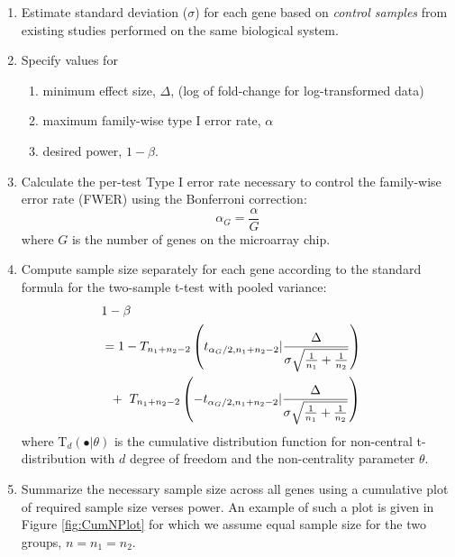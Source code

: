 \documentclass[12pt]{article}
\begin{document}
\begin{enumerate}
\item{Estimate standard deviation ($\sigma$) for each gene based on
    \emph{control samples} from existing studies performed on the
    same biological system.}

\item{Specify values for
    \begin{enumerate}
    \item minimum effect size, $\Delta$, (log of fold-change for
          log-transformed data)
    \item maximum family-wise type I error rate, $\alpha$
    \item desired power, $1 - \beta$.
    \end{enumerate}
  }

\item{Calculate the per-test Type I error rate necessary to control
      the family-wise error rate (FWER) using the Bonferroni correction:}
\begin{equation}
  \alpha_G = \frac{\alpha}{G}
\end{equation}
%
where $G$ is the number of genes on the microarray chip.

\item{Compute sample size separately for each gene according to the
    standard formula for the two-sample t-test with pooled variance:}
  \begin{eqnarray}
    \lefteqn{1-\beta} \nonumber \\
    &= 1-T_{n_1+n_2-2} \left( t_{\alpha_G/2,n_1+n_2-2} | \frac{\Delta}{\sigma \sqrt{\frac{1}{n_1} + \frac{1}{n_2}}}\right) \nonumber \\
    &  ~~+~T_{n_1+n_2-2} \left( -t_{\alpha_G/2,n_1+n_2-2} | \frac{\Delta}{\sigma \sqrt{\frac{1}{n_1} + \frac{1}{n_2}}}\right)
    \label{eq:formula}
  \end{eqnarray}
  where $\mathrm{T}_{d}(\bullet|\theta)$ is the cumulative
  distribution function for non-central t-distribution with $d$ degree
  of freedom and the non-centrality parameter $\theta$.

\item{Summarize the necessary sample size across all genes using a
      cumulative plot of required sample size verses power. An
      example of such a plot is given in Figure \ref{fig:CumNPlot}
      for which we assume equal sample size for the two groups, $n =
      n_1 = n_2$.}

\end{enumerate}
\end{document}
